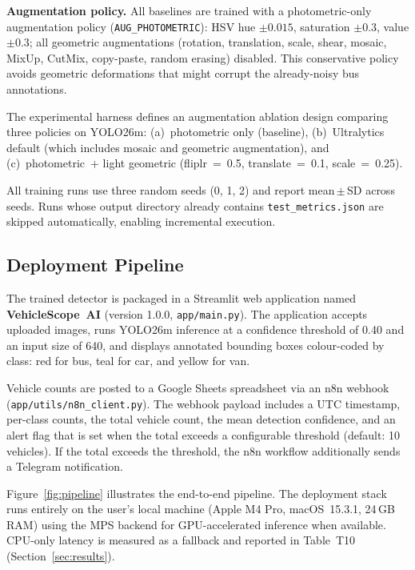 \textbf{Augmentation policy.}
All baselines are trained with a photometric-only augmentation policy
(\texttt{AUG\_PHOTOMETRIC}):
HSV hue $\pm0.015$, saturation $\pm0.3$, value $\pm0.3$;
all geometric augmentations (rotation, translation, scale, shear,
mosaic, MixUp, CutMix, copy-paste, random erasing) disabled.
This conservative policy avoids geometric deformations that might
corrupt the already-noisy bus annotations.

The experimental harness defines an augmentation ablation design comparing three
policies on YOLO26m:
(a)~photometric only (baseline),
(b)~Ultralytics default (which includes mosaic and geometric
    augmentation), and
(c)~photometric~+ light geometric
    (fliplr~=~0.5, translate~=~0.1, scale~=~0.25).

All training runs use three random seeds (0, 1, 2) and report
mean\,$\pm$\,SD across seeds.
Runs whose output directory already contains \texttt{test\_metrics.json}
are skipped automatically, enabling incremental execution.

\subsection{Deployment Pipeline}
\label{sec:deployment}

The trained detector is packaged in a Streamlit web application named
\textbf{VehicleScope~AI} (version 1.0.0, \texttt{app/main.py}).
The application accepts uploaded images, runs YOLO26m inference at a
confidence threshold of 0.40 and an input size of 640, and displays
annotated bounding boxes colour-coded by class:
red for bus, teal for car, and yellow for van.

Vehicle counts are posted to a Google Sheets spreadsheet via an n8n
webhook (\texttt{app/utils/n8n\_client.py}).
The webhook payload includes a UTC timestamp, per-class counts, the total
vehicle count, the mean detection confidence, and an alert flag that is
set when the total exceeds a configurable threshold (default: 10 vehicles).
If the total exceeds the threshold, the n8n workflow additionally sends a
Telegram notification.

Figure~\ref{fig:pipeline} illustrates the end-to-end pipeline.
The deployment stack runs entirely on the user's local machine (Apple M4 Pro,
macOS~15.3.1, 24\,GB RAM) using the MPS backend for GPU-accelerated
inference when available.
CPU-only latency is measured as a fallback and reported in
Table~T10 (Section~\ref{sec:results}).
